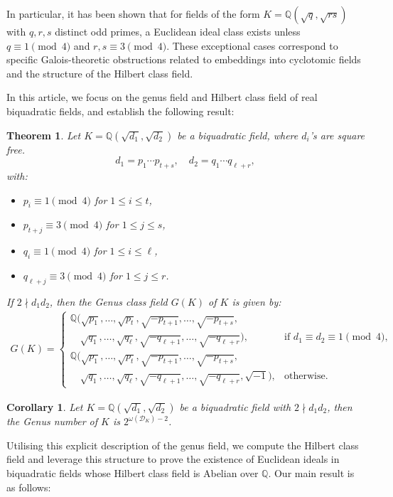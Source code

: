 \documentclass[12 pt]{amsart}
\newcommand\cD{{\mathcal{D}}}
\newtheorem{theorem}[thm]{Theorem}
\newtheorem{cor}[thm]{Corollary}
\theoremstyle{definition}
\theoremstyle{remark}
\begin{document}
In particular, it has been shown that for fields of the form $K = \mathbb{Q}(\sqrt{q}, \sqrt{rs})$ with $q, r, s$ distinct odd primes, a Euclidean ideal class exists unless $q \equiv 1 \pmod{4}$ and $r, s \equiv 3 \pmod{4}$. These exceptional cases correspond to specific Galois-theoretic obstructions related to embeddings into cyclotomic fields and the structure of the Hilbert class field.

In this article, we focus on the genus field and Hilbert class field of real biquadratic fields, and establish the following result:

\begin{theorem} \label{genustheory_for_biquadratic}
Let $K = \mathbb{Q}(\sqrt{d_1}, \sqrt{d_2})$ be a biquadratic field, where $d_i$'s are square free.
\[
d_1 = p_1 \cdots p_{t+s}, \quad d_2 = q_1 \cdots q_{\ell+r},
\]
with:
\begin{itemize}
  \item $p_i \equiv 1 \pmod{4}$ for $1 \leq i \leq t$,
  \item $p_{t+j} \equiv 3 \pmod{4}$ for $1 \leq j \leq s$,
  \item $q_i \equiv 1 \pmod{4}$ for $1 \leq i \leq \ell$,
  \item $q_{\ell+j} \equiv 3 \pmod{4}$ for $1 \leq j \leq r$.
\end{itemize}
 If $2\nmid d_1d_2$, then the Genus class field $G(K)$ of $K$ is given by:
\begin{equation}
\begin{aligned}
G(K) =
\begin{cases}
\mathbb{Q}\big( \sqrt{p_1}, \dots, \sqrt{p_t}, \sqrt{-p_{t+1}}, \dots, \sqrt{-p_{t+s}}, \\
\quad \sqrt{q_1}, \dots, \sqrt{q_\ell}, \sqrt{-q_{\ell+1}}, \dots, \sqrt{-q_{\ell+r}} \big), & \text{if } d_1 \equiv d_2 \equiv 1 \pmod{4}, \\[1ex]
\mathbb{Q}\big( \sqrt{p_1}, \dots, \sqrt{p_t}, \sqrt{-p_{t+1}}, \dots, \sqrt{-p_{t+s}}, \\
\quad \sqrt{q_1}, \dots, \sqrt{q_\ell}, \sqrt{-q_{\ell+1}}, \dots, \sqrt{-q_{\ell+r}}, \sqrt{-1} \big), & \text{otherwise}.
\end{cases}
\end{aligned}
\end{equation}
\end{theorem}

\begin{cor}
    Let $K = \mathbb{Q}(\sqrt{d_1}, \sqrt{d_2})$ be a biquadratic field with  $2\nmid d_1d_2$, then the Genus number of $K$ is $2^{\omega(\cD_K)-2}$.
\end{cor}
Utilising this explicit description of the genus field, we compute the Hilbert class field and leverage this structure to prove the existence of Euclidean ideals in biquadratic fields whose Hilbert class field is Abelian over $\mathbb{Q}$. Our main result is as follows:
\end{document}
